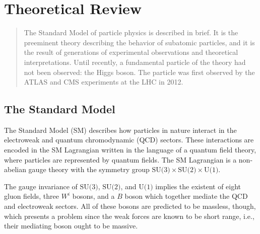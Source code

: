 \chapter[Theoretical Review][Theoretical Review]{Theoretical Review}
\label{chap:standardmodel}

\begin{quote}
  The Standard Model of particle physics is described in brief. It is the preeminent theory describing the behavior of subatomic particles, and it is the result of generations of experimental observations and theoretical interpretations. Until recently, a fundamental particle of the theory had not been observed: the Higgs boson. The particle was first observed by the ATLAS and CMS experiments at the LHC in 2012.
\end{quote}

\section{The Standard Model}

The Standard Model (SM) describes how particles in nature interact in the electroweak and quantum chromodynamic (QCD) sectors. These interactions are encoded in the SM Lagrangian written in the language of a quantum field theory, where particles are represented by quantum fields. The SM Lagrangian is a non-abelian gauge theory with the symmetry group $\text{SU(3)}\times\text{SU(2)}\times\text{U(1)}$. 


The gauge invariance of $\text{SU(3)}$, $\text{SU(2)}$, and $\text{U(1)}$ implies the existent of eight gluon fields, three $W^i$ bosons, and a $B$ boson which together mediate the QCD and electroweak sectors. All of these bosons are predicted to be massless, though, which presents a problem since the weak forces are known to be short range, i.e., their mediating boson ought to be massive.

